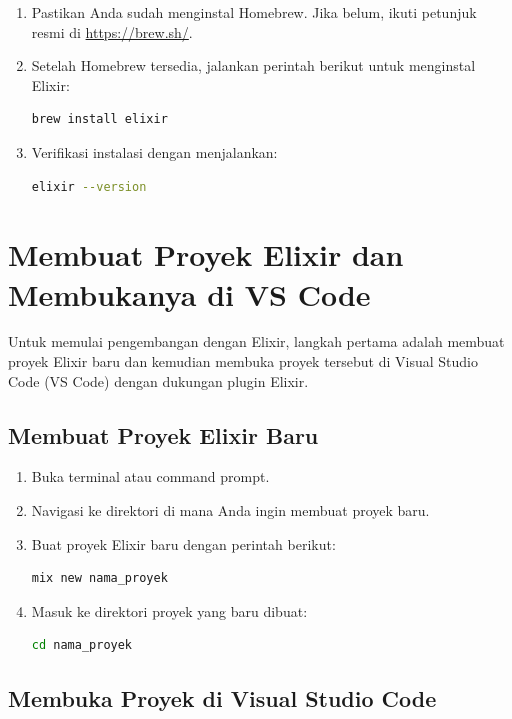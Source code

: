 \begin{enumerate}
	\item Pastikan Anda sudah menginstal Homebrew. Jika belum, ikuti petunjuk resmi di \url{https://brew.sh/}.  
	\item Setelah Homebrew tersedia, jalankan perintah berikut untuk menginstal Elixir:  
	\begin{lstlisting}[language=bash]
		brew install elixir
	\end{lstlisting}
	\item Verifikasi instalasi dengan menjalankan:  
	\begin{lstlisting}[language=bash]
		elixir --version
	\end{lstlisting}
\end{enumerate}



\section{Membuat Proyek Elixir dan Membukanya di VS Code}

Untuk memulai pengembangan dengan Elixir, langkah pertama adalah membuat proyek Elixir baru dan kemudian membuka proyek tersebut di Visual Studio Code (VS Code) dengan dukungan plugin Elixir.

\subsection{Membuat Proyek Elixir Baru}

\begin{enumerate}
	\item Buka terminal atau command prompt.
	\item Navigasi ke direktori di mana Anda ingin membuat proyek baru.
	\item Buat proyek Elixir baru dengan perintah berikut:
	\begin{lstlisting}[language=bash]
		mix new nama_proyek
	\end{lstlisting}
	\item Masuk ke direktori proyek yang baru dibuat:
	\begin{lstlisting}[language=bash]
		cd nama_proyek
	\end{lstlisting}
\end{enumerate}

\subsection{Membuka Proyek di Visual Studio Code}

